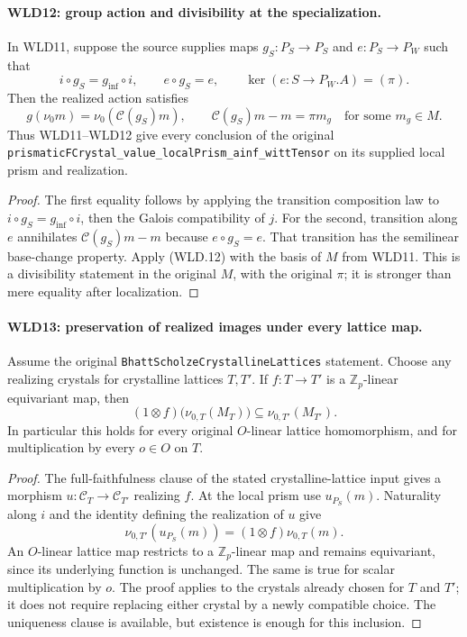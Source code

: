 \documentclass[11pt,a4paper]{article}
\numberwithin{equation}{section}
\theoremstyle{remark}\newtheorem{remark}[theorem]{Remark}
\begin{document}
\paragraph{WLD12: group action and divisibility at the specialization.}
\label{claim:WLD12}
In WLD11, suppose the source supplies maps
$g_S:P_S\to P_S$ and $e:P_S\to P_W$ such that
\[
 i\circ g_S=g_{\inf}\circ i,\qquad e\circ g_S=e,\qquad
                         \ker(e:S\to P_W.A)=(\pi).
\]
Then the realized action satisfies
\[
 g(\nu_0m)=\nu_0(\mathcal C(g_S)m),\qquad
                 \mathcal C(g_S)m-m=\pi m_g
                         \quad\text{for some }m_g\in M.    \tag{WLD.14}
\]
Thus WLD11--WLD12 give every conclusion of the original
\texttt{prismatic\allowbreak FCrystal\_\allowbreak value\_\allowbreak local\allowbreak Prism\_\allowbreak ainf\_\allowbreak witt\allowbreak Tensor}
on its supplied local prism and realization.

\begin{proof}
The first equality follows by applying the transition composition
law to $i\circ g_S=g_{\inf}\circ i$, then the Galois compatibility
of $j$. For the second, transition along $e$ annihilates
$\mathcal C(g_S)m-m$ because $e\circ g_S=e$.
That transition has the semilinear base-change property.
Apply (WLD.12) with the basis of $M$ from WLD11.
This is a divisibility statement in the original $M$, with the
original $\pi$; it is stronger than mere equality after localization.
\end{proof}

\paragraph{WLD13: preservation of realized images under every lattice map.}
\label{claim:WLD13}
Assume the original \texttt{Bhatt\allowbreak Scholze\allowbreak Crystalline\allowbreak Lattices}
statement. Choose any realizing crystals for crystalline lattices
$T,T'$. If $f:T\to T'$ is a $\mathbb Z_p$-linear equivariant map,
then
\[
 (1\otimes f)\bigl(\nu_{0,T}(M_T)\bigr)
                          \subseteq \nu_{0,T'}(M_{T'}).    \tag{WLD.15}
\]
In particular this holds for every original $O$-linear lattice
homomorphism, and for multiplication by every $o\in O$ on $T$.

\begin{proof}
The full-faithfulness clause of the stated crystalline-lattice input
gives a morphism $u:\mathcal C_T\to\mathcal C_{T'}$ realizing $f$.
At the local prism use $u_{P_S}(m)$. Naturality along $i$ and the
identity defining the realization of $u$ give
\[
 \nu_{0,T'}(u_{P_S}(m))
       =(1\otimes f)\nu_{0,T}(m).
\]
An $O$-linear lattice map restricts to a $\mathbb Z_p$-linear map
and remains equivariant, since its underlying function is unchanged.
The same is true for scalar multiplication by $o$.
The proof applies to the crystals already chosen for $T$ and $T'$;
it does not require replacing either crystal by a newly compatible
choice. The uniqueness clause is available, but existence is enough
for this inclusion.
\end{proof}
\end{document}
